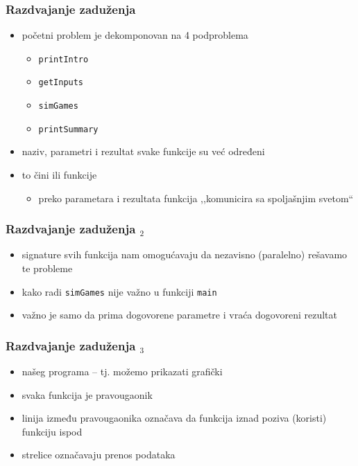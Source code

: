 \documentclass[utf8,compress]{beamer}
\begin{document}
\begin{frame}
  \frametitle{Razdvajanje zaduženja}
  \begin{itemize}
    \item početni problem je dekomponovan na 4 podproblema
    \begin{itemize}
      \item \texttt{printIntro}
      \item \texttt{getInputs}
      \item \texttt{simGames}
      \item \texttt{printSummary}
    \end{itemize}
    \item naziv, parametri i rezultat svake funkcije su već određeni
    \item to čini  ili  funkcije
    \begin{itemize}
      \item preko parametara i rezultata funkcija ,,komunicira sa spoljašnjim svetom``
    \end{itemize}
  \end{itemize}
\end{frame}

\begin{frame}
  \frametitle{Razdvajanje zaduženja $_2$}
  \begin{itemize}
    \item signature svih funkcija nam omogućavaju da nezavisno (paralelno) rešavamo te probleme
    \item kako radi \texttt{simGames} nije važno u funkciji \texttt{main}
    \item važno je samo da prima dogovorene parametre i vraća dogovoreni rezultat
  \end{itemize}
\end{frame}

\begin{frame}
  \frametitle{Razdvajanje zaduženja $_3$}
  \begin{itemize}
    \item {} našeg programa -- tj.  možemo prikazati grafički
    \item svaka funkcija je pravougaonik
    \item linija između pravougaonika označava da funkcija iznad poziva (koristi) funkciju ispod
    \item strelice označavaju prenos podataka
  \end{itemize}
\end{frame}
\end{document}
